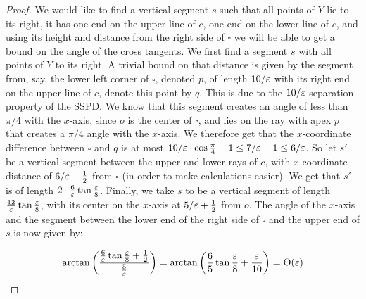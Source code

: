 \documentclass[12pt]{article}%
\begin{document}
\begin{proof}
    We would like to find a vertical segment $s$ such that all points of $Y$ lie to its right, it has one end on the upper line of $c$, one end on the lower line of $c$, and using its height and distance from the right side of $\square$ we will be able to get a bound on the angle of the cross tangents. We first find a segment $s$ with all points of $Y$ to its right. A trivial bound on that distance is given by the segment from, say, the lower left corner of $\square$, denoted $p$, of length $10/\varepsilon$ with its right end on the upper line of $c$, denote this point by $q$. This is due to the $10/\varepsilon$ separation property of the SSPD. We know that this segment creates an angle of less than $\pi/4$ with the $x$-axis, since $o$ is the center of $\square$, and lies on the ray with apex $p$ that creates a $\pi/4$ angle with the $x$-axis. We therefore get that the $x$-coordinate difference between $\square$ and $q$ is at most $10/\varepsilon\cdot \cos\frac{\pi}{4}-1\leq 7/\varepsilon-1\leq 6/\varepsilon$. So let $s'$ be a vertical segment between the upper and lower rays of $c$, with $x$-coordinate distance of $6/\varepsilon-\frac{1}{2}$ from $\square$ (in order to make calculations easier). We get that $s'$ is of length $2\cdot \frac{6}{\varepsilon}\tan \frac{\varepsilon}{8}$. Finally, we take $s$ to be a vertical segment of length $\frac{12}{\varepsilon}\tan \frac{\varepsilon}{8}$, with its center on the $x$-axis at $5/\varepsilon+\frac{1}{2}$ from $o$. The angle of the $x$-axis and the segment between the lower end of the right side of $\square$ and the upper end of $s$ is now given by:
    
    \begin{equation*}
    	\arctan\left(\frac{\frac{6}{\eps}\tan\frac{\eps}{8}+\frac{1}{2}}{\frac{5}{\eps}}\right)%
    	=%
    	\arctan \left( \frac{6}{5}\tan\frac{\eps}{8}+\frac{\eps}{10} \right)%
    	=%
    	\Theta(\eps)%
    \end{equation*}

 
\end{proof}
\end{document}
